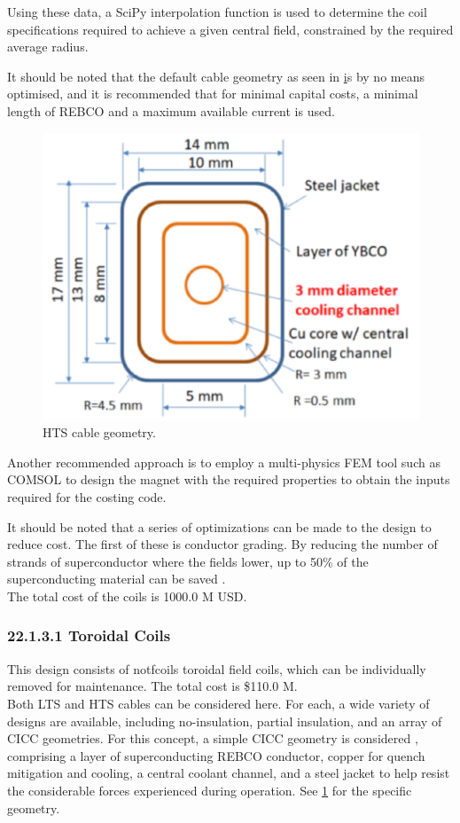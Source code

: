 Using these data, a SciPy interpolation function is used to determine the coil specifications required to achieve a given central field, constrained by the required average radius.

It should be noted that the default cable geometry as seen in \href{fig:yuhu_cs} is by no means optimised, and it is recommended that for minimal capital costs, a minimal length of REBCO and a maximum available current is used.


\begin{figure}[h]
    \centering
    \includegraphics[width =0.5\linewidth]{StandardFigures/yuhu_cs.pdf}
    \caption{HTS cable geometry.}
    \label{fig:yuhu_cs}
\end{figure}

Another recommended approach is to employ a multi-physics FEM tool such as COMSOL to design the magnet with the required properties to obtain the inputs required for the costing code.

It should be noted that a series of optimizations can be made to the design to reduce cost. The first of these is conductor grading. By reducing the number of strands of superconductor where the fields lower, up to 50\% of the superconducting material can be saved \cite{uglietti2018progressing}.\\

The total cost of the coils is 1000.0 M USD.


\subsubsection*{22.1.3.1 Toroidal Coils}

This design consists of notfcoils toroidal field coils, which can be individually removed for maintenance. The total cost is \$110.0 M.\\

Both LTS and HTS cables can be considered here. For each, a wide variety of designs are available, including no-insulation, partial insulation, and an array of CICC geometries. For this concept, a simple CICC geometry is considered \cite{Menard2016}, comprising a layer of superconducting REBCO conductor, copper for quench mitigation and cooling, a central coolant channel, and a steel jacket to help resist the considerable forces experienced during operation. See \ref{fig:yuhu_cs} for the specific geometry.\\

